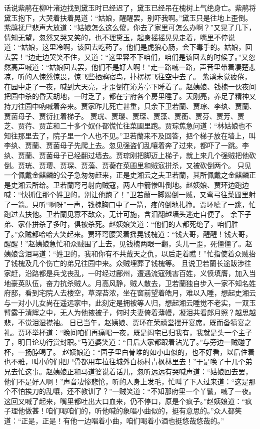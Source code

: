 \documentclass[12pt,oneside]{book}
\begin{document}
话说紫鹃在柳叶渚边找到黛玉时已经迟了，黛玉已经吊在槐树上气绝身亡。紫鹃将黛玉抱下，大哭着扶着晃道：“姑娘，醒醒罢，别吓我啊。”黛玉只是往地上歪倒。紫鹃抚尸悲声大放道：“姑娘怎么这么傻，你去了家里可怎么办啊？”又晃了几下，情知无望，忽然又哭又笑的，也不理黛玉，起身摇摇晃晃走着，嘴里不停说道：“姑娘，这里冷啊，该回去吃药了。他们是虎狼心肠，会下毒手的。姑娘，回去罢！”边走边哭笑不住，又道：“这里容不下咱们，咱们是该回去的时候了。”又忽然高声喊道：“姑娘回去罢，他们不是好人啊！”走一路喊一路，声音里带着凄楚悲凉，听的人悚然惊畏，惊飞些栖鸦宿鸟，扑楞楞飞往空中去了。
紫鹃未觉疲倦，在园中走了一夜，喊到大天亮，才歪倒在沁芳亭下睡着了。赵姨娘、钱槐一伙夜间把园中杀的昏天胡地，一时乏了，都在宁府各个房里睡了。天刚亮，养足了精神又持刀往园中吶喊着奔来。贾家昨儿死亡甚重，只余下卫若蘭、贾琮、李纨、贾蘭、贾菌母子、贾衍扛着梯子。
贾珖、贾璎、贾琛、贾藻、贾蘅、贾芬、贾芳、贾芝、贾荇、贾芷和二十多个奴仆都慌忙往菜圃里跑。贾琮焦急问道：“林姑娘也不知往那里去了，院子里一个人也不见。”卫若蘭来不及回答，把个梯子放在墙上，叫李纨、贾蘭、贾菌母子先爬上去。忽见强盗们乱嚷着奔了过来，都吓了一跳。李纨、贾蘭、贾菌母子已经翻过墙去。贾琮刚把脚迈上梯子，就上来几个强贼把他砍倒。贾珖、贾璎、贾琛、贾藻、贾蘅在菜圃里和贼寇拼杀，又被砍倒两个。
只见一个佩戴金麒麟的公子急匆匆赶来，正是史湘云之夫卫若蘭，其所佩戴之金麒麟正是史湘云所给。卫若蘭弯弓射向贼寇，两人中箭惨叫倒地。赵姨娘、贾环边跑边喊：“快抓住那个姓卫的，别让他跑了！”卫若蘭一脚踢倒一贼，又弯弓往菜圃里射了一箭。只听“啊呀”一声，钱槐胸口中了一箭，疼的倒地扎挣。贾环唬了一跳，忙跑过去扶他。卫若蘭见寡不敌众，无计可施，含泪翻越墙头逃走自便了。
余下子弟、家仆拼杀了多时，俱被杀死。赵姨娘笑道：“他们的人都死绝了，咱们胜了。”众贼都哈哈大笑起来。贾环弯腰哭着摇晃钱槐道：“钱大哥，醒醒！钱大哥，醒醒！”赵姨娘急忙和众贼围了上去，见钱槐两眼一翻，头儿一歪，死僵僵了。赵姨娘含泪骂道：“姓卫的，我和你有不共戴天之仇，以后走着瞧！”忙指使着众贼抬了钱槐及几个伤亡的弟兄往园中来。众贼埋葬了钱槐等。
且说卫若蘭长途跋涉往家赶，沿路都是兵戈丧乱，一时经过鄜州，遭遇流寇残害百姓，义愤填膺，加入当地豪英队伍，奋力抗杀贼人。月高风静，贼人散去，卫若蘭独自步入一家不知名姓府邸，看到宅院人去楼空，草深苔浓，坐在窗前望着皓月，难以入睡，想起史湘云与一对小儿女尚在遥远家中，此刻定是拥被等人归，想起湘云睡觉不老实，一双玉臂露于清辉之中，无人为他掖被子，何时夫妻倚着薄幔，凝泪共看郎月照？越思越悲，不觉泪湿襟袖。
日已当午，赵姨娘、贾环在荣禧堂摆开宴席，既而备犒宴之礼。贾环举杯道：“晚间咱们再痛喝一夜，既是阖宅已归我有，我就是头一个主子了，明日论功行赏封职。”马道婆笑道：“日后大家都跟着沾光了。”与旁边一贼碰了杯，一扬脖喝了。
赵姨娘道：“园子里白骨堆的如小山似的，也不好看，以后住着也不雅，叫小的们把尸骨都用车拉往城外白杨村青枫林里去！”于是唤了十几个弟兄去忙这事。赵姨娘正和马道婆说着话儿，忽听远远有哭喊声道：“姑娘回去罢，他们不是好人啊！”声音凄惨悲怆，听的人身上发毛，忙叫了下人过来道：“这是那个不怕挨刀的乱嚷，还不教训了？”一贼笑道：“不知那府里一个丫鬟，喊了一夜。这回又喊了起来，嘴里都吐出大口血来，仍不停口，原是个疯子。”赵姨娘道：“疯子理他做甚！咱们喝咱们的，听他喊的象唱小曲似的，挺有意思的。”众人都笑道：“正是，正是！有他一边唱着小曲，咱们喝着小酒也挺悠哉悠哉的。”
\end{document}

